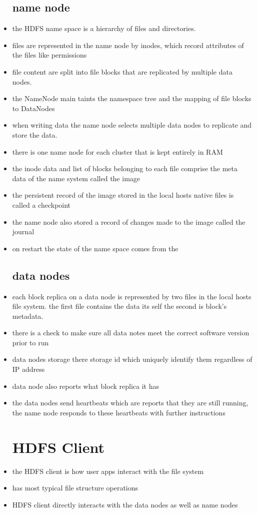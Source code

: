 \documentclass{article}
\begin{document}
\begin{itemize}
\subsection{name node}
\item the HDFS name space is a hierarchy of files and directories. 
\item files are represented in the name node by inodes, which record attributes of the files like permissions 
\item file content are split into file blocks that are replicated by multiple data nodes. 
\item the NameNode main taints the namespace tree and the mapping of file blocks to DataNodes
\item when writing data the name node selects multiple data nodes to replicate and store the data.
\item there is one name node for each cluster that is kept entirely in RAM
\item the inode data and list of blocks belonging to each file comprise the meta data of the name system called the image
\item the persistent record of the image stored in the local hosts native files is called a checkpoint 
\item the name node also stored a record of changes made to the image called the journal 
\item on restart the state of the name space comes from the  
\subsection{data nodes}
\item each block replica on a data node is represented by two files in the local hosts file system. the first file contains the data its self the second is block's metadata.
\item there is a check to make sure all data notes meet the correct software version prior to run 
\item data nodes storage there storage id which uniquely identify them regardless of IP address
\item data node also reports what block replica it has 
\item the data nodes send heartbeats which are reports that they are still running, the name node responds to these heartbeats with further instructions 
\section{HDFS Client}
\item the HDFS client is how user apps interact with the file system 
\item has most typical file structure operations
\item HDFS client directly interacts with the data nodes as well as name nodes

\end{itemize}
\end{document}
